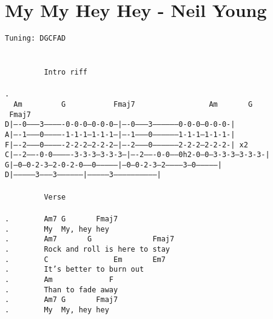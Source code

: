\newpage
\section{My My Hey Hey - Neil Young}
\label{My My Hey Hey - Neil Young}
\texttt{Tuning:\ DGCFAD\\
\\
\\
\ \ \ \ \ \ \ \ \lbrack\ Intro\ riff\rbrack\\
\\
. \ \ Am\ \ \ \ \ \ \ \ \ G\ \ \ \ \ \ \ \ \ \ \ Fmaj7\ \ \ \ \ \ \ \ \ \ \ \ \ \ \ \ \ Am\ \ \ \ \ \ \ G\ \ \ \ \ \ \ \ \ \ \ \ \ \ Fmaj7\\
D|----0---------3-------------0-0-0--0-0-0--|----0---------3-----------------0-0-0--0-0-0-|\\
A|----1---------0-------------1-1-1--1-1-1--|----1---------0-----------------1-1-1--1-1-1-|\\
F|----2---------0-------------2-2-2--2-2-2--|----2---------0-----------------2-2-2--2-2-2-|\ x2\\
C|----2-------0-0-------------3-3-3--3-3-3--|----2-------0-0-----0h2-0---0---3-3-3--3-3-3-|\\
G|--0---0-2-3---2-0-2-0-----0---------------|--0---0-2-3---2-----------3---0--------------|\\
D|--------------3---------3-----------------|--------------3------------------------------|\\
\\
\ \ \ \ \ \ \ \ \lbrack\ Verse\rbrack\\
\\
. \ \ \ \ \ \ \ Am7\ G\ \ \ \ \ \ \ Fmaj7\\
. \ \ \ \ \ \ \ My\ \ My,\ hey\ hey\\
. \ \ \ \ \ \ \ Am7\ \ \ \ \ \ \ G\ \ \ \ \ \ \ \ \ \ \ \ \ \ Fmaj7\\
. \ \ \ \ \ \ \ Rock\ and\ roll\ is\ here\ to\ stay\\
. \ \ \ \ \ \ \ C\ \ \ \ \ \ \ \ \ \ \ \ \ \ \ Em\ \ \ \ \ \ \ Em7\\
. \ \ \ \ \ \ \ It's\ better\ to\ burn\ out\\
. \ \ \ \ \ \ \ Am\ \ \ \ \ \ \ \ \ \ \ \ \ F\\
. \ \ \ \ \ \ \ Than\ to\ fade\ away\\
. \ \ \ \ \ \ \ Am7\ G\ \ \ \ \ \ \ Fmaj7\\
. \ \ \ \ \ \ \ My\ \ My,\ hey\ hey\\
\\
}
